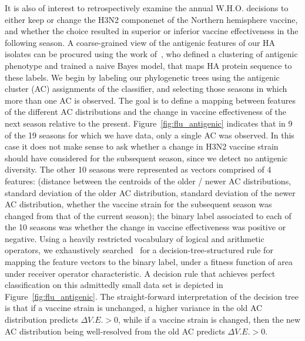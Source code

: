 \documentclass[a4paper,11pt]{article}
\begin{document}
It is also of interest to retrospectively examine the annual W.H.O. decisions to either keep or change the H3N2 componenet of the Northern hemisphere vaccine, and whether the choice resulted in superior or inferior vaccine effectiveness in the following season.
A coarse-grained view of the antigenic features of our HA isolates can be procured using the work of~\cite{du2012mapping}, who defined a clustering of antigenic phenotype and trained a naive Bayes model, that maps HA protein sequence to these labels.
We begin by labeling our phylogenetic trees using the antigenic cluster (AC) assignments of the classifier, and selecting those seasons in which more than one AC is observed.
The goal is to define a mapping between features of the different AC distributions and the change in vaccine effectiveness of the next season relative to the present.
Figure~\ref{fig:flu_antigenic} indicates that in 9 of the 19 seasons for which we have data, only a single AC was observed.
In this case it does not make sense to ask whether a change in H3N2 vaccine strain should have considered for the subsequent season, since we detect no antigenic diversity.
The other 10 seasons were represented as vectors comprised of 4 features: (distance between the centroids of the older / newer AC distributions, standard deviation of the older AC distribution, standard deviation of the newer AC distribution, whether the vaccine strain for the subsequent season was changed from that of the current season); the binary label associated to each of the 10 seasons was whether the change in vaccine effectiveness was positive or negative.
Using a heavily restricted vocabulary of logical and arithmetic operators, we exhaustively searched~\cite{schmidt2009distilling} for a decision-tree-structured rule for mapping the feature vectors to the binary label, under a fitness function of area under receiver operator characteristic.
A decision rule that achieves perfect classification on this admittedly small data set is depicted in Figure~\ref{fig:flu_antigenic}.
The straight-forward interpretation of the decision tree is that if a vaccine strain is unchanged, a higher variance in the old AC distribution predicts $\Delta V.E. > 0$, while if a vaccine strain is changed, then the new AC distribution being well-resolved from the old AC predicts $\Delta V.E. > 0$.
\end{document}
